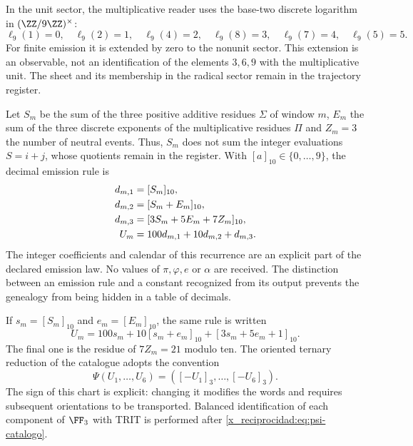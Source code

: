 In the unit sector, the multiplicative reader uses the base-two discrete logarithm in \((\ZZ/9\ZZ)^\times\):
\[
 \ell_9(1)=0,\quad\ell_9(2)=1,\quad\ell_9(4)=2,\quad
 \ell_9(8)=3,\quad\ell_9(7)=4,\quad\ell_9(5)=5.
\]
For finite emission it is extended by zero to the nonunit sector. This extension is an observable, not an identification of the elements \(3,6,9\) with the multiplicative unit. The sheet and its membership in the radical sector remain in the trajectory register.

Let \(S_m\) be the sum of the three positive additive residues \(\Sigma\) of window \(m\), \(E_m\) the sum of the three discrete exponents of the multiplicative residues \(\Pi\) and \(Z_m=3\) the number of neutral events. Thus, \(S_m\) does not sum the integer evaluations \(S=i+j\), whose quotients remain in the register. With \([a]_{10}\in\{0,\ldots,9\}\), the decimal emission rule is
\begin{align}
 d_{m,1}&=[S_m]_{10},\notag\\
 d_{m,2}&=[S_m+E_m]_{10},\notag\\
 d_{m,3}&=[3S_m+5E_m+7Z_m]_{10},\notag\\
 U_m&=100d_{m,1}+10d_{m,2}+d_{m,3}.
 \label{x_reciprocidad:eq:emisor-seis}
\end{align}
The integer coefficients and calendar of this recurrence are an explicit part of the declared emission law. No values of \(\pi,\varphi,e\) or \(\alpha\) are received. The distinction between an emission rule and a constant recognized from its output prevents the genealogy from being hidden in a table of decimals.

If \(s_m=[S_m]_{10}\) and \(e_m=[E_m]_{10}\), the same rule is written
\begin{equation}
 U_m=100s_m+10[s_m+e_m]_{10}+[3s_m+5e_m+1]_{10}.
 \label{x_reciprocidad:eq:acoplamiento}
\end{equation}
The final one is the residue of \(7Z_m=21\) modulo ten. The oriented ternary reduction of the catalogue adopts the convention
\begin{equation}
 \Psi(U_1,\ldots,U_6)=([-U_1]_3,\ldots,[-U_6]_3).
 \label{x_reciprocidad:eq:psi-catalogo}
\end{equation}
The sign of this chart is explicit: changing it modifies the words and requires subsequent orientations to be transported. Balanced identification of each component of \(\FF_3\) with TRIT is performed after \eqref{x_reciprocidad:eq:psi-catalogo}.

